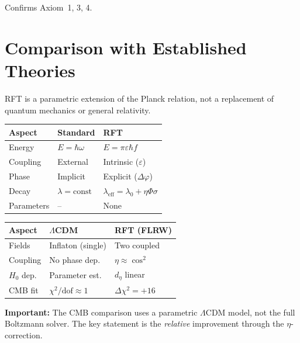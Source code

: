 \documentclass[12pt]{iopart}
\begin{document}
	Confirms Axiom~1, 3, 4.
	
	\section{Comparison with Established Theories}
	
	RFT is a parametric extension of the Planck relation,
	not a replacement of quantum mechanics or general
	relativity.
	
	\medskip
	\begin{center}
		\small
		\begin{tabular}{lll}
			\hline
			\textbf{Aspect} & \textbf{Standard}
			& \textbf{RFT} \\
			\hline
			Energy & $E = \hbar\omega$
			& $E = \pi\varepsilon\hbar f$ \\
			Coupling & External
			& Intrinsic ($\varepsilon$) \\
			Phase & Implicit
			& Explicit ($\Delta\varphi$) \\
			Decay & $\lambda = \mathrm{const}$
			& $\lambda_{\mathrm{eff}}
			= \lambda_0 + \eta\Phi\sigma$ \\
			Parameters & --
			& None \\
			\hline
		\end{tabular}
	\end{center}
	
	\medskip
	\begin{center}
		\small
		\begin{tabular}{lll}
			\hline
			\textbf{Aspect}
			& \textbf{$\Lambda$CDM}
			& \textbf{RFT (FLRW)} \\
			\hline
			Fields & Inflaton (single)
			& Two coupled \\
			Coupling & No phase dep.
			& $\eta \approx \cos^2$ \\
			$H_0$ dep. & Parameter est.
			& $d_\eta$ linear \\
			CMB fit & $\chi^2/\mathrm{dof}
			\approx 1$
			& $\Delta\chi^2 = +16$ \\
			\hline
		\end{tabular}
	\end{center}
	
	\textbf{Important:} The CMB comparison uses a parametric
	$\Lambda$CDM model, not the full Boltzmann solver.
	The key statement is the \textit{relative} improvement
	through the $\eta$-correction.
	
\end{document}
